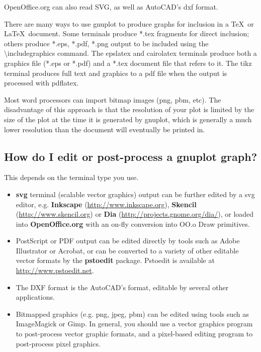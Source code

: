 \documentclass[a4paper,11pt]{article}
\def\http#1{{\small\href{http://#1}{\url{http://#1}}}}
\newcommand{\http}[1]%
            {\htmladdnormallink{\latex{\url{http://#1}}%
                    \html{\textit{http://#1}}}%
                {http://#1}%
            }
\newcommand{\gnuplot}{\textbf{gnuplot }}
\begin{document}
OpenOffice.org can also read SVG, as well as AutoCAD's dxf format.

There are many ways to use gnuplot to produce graphs for inclusion in a
\TeX\ or \LaTeX\ document.  
Some terminals produce *.tex fragments for direct inclusion; others 
produce *.eps, *.pdf, *.png output to be included using the
\textbackslash{}includegraphics command.
The epslatex and cairolatex terminals produce both a graphics
file (*.eps or *.pdf) and a *.tex document file that refers to it.
The tikz terminal produces full text and graphics to a pdf file
when the output is processed with pdflatex.

Most word processors can import bitmap images (png, pbm, etc).
The disadvantage of this approach is that the resolution of your
plot is limited by the size of the plot at the time it is generated
by gnuplot, which is generally a much lower resolution than the
document will eventually be printed in.


\subsection{How do I edit or post-process a \gnuplot graph?}

This depends on the terminal type you use.

\begin{itemize}

\item \textbf{svg} terminal (scalable vector graphics) output can
be further edited by a svg editor, e.g. 
\textbf{Inkscape} (\http{www.inkscape.org}),
\textbf{Skencil} (\http{www.skencil.org}) or
\textbf{Dia} (\http{projects.gnome.org/dia/}), or loaded
into \textbf{OpenOffice.org} with an on-fly conversion into OO.o Draw
primitives.

\item PostScript or PDF output can be edited directly by tools such
as Adobe Illustrator or Acrobat, or can be converted to a variety
of other editable vector formats by the \textbf{pstoedit} package.
Pstoedit is available at \http{www.pstoedit.net}.

\item The DXF format is the AutoCAD's format, editable by several
other applications.

\item Bitmapped graphics (e.g. png, jpeg, pbm) can be edited using
tools such as ImageMagick or Gimp.  
In general, you should use a vector graphics program to post-process
vector graphic formats, and a pixel-based editing program 
to post-process pixel graphics.

\end{itemize}
\end{document}
